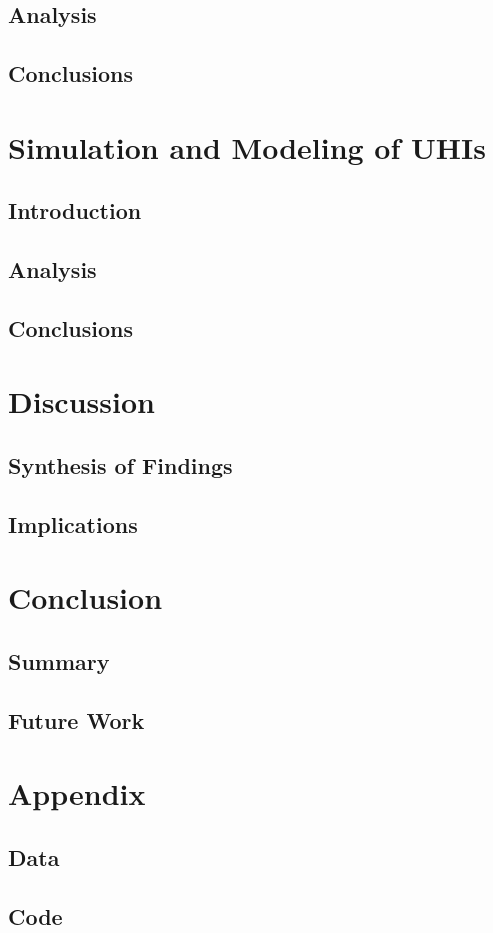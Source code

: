 \documentclass[a4paper, english]{article}
\begin{document}
    \subsection{Analysis}
    \subsection{Conclusions}

\section{Simulation and Modeling of UHIs}
    \subsection{Introduction}
    \subsection{Analysis}
    \subsection{Conclusions}

\section{Discussion}
    \subsection{Synthesis of Findings}
    \subsection{Implications}

\section{Conclusion}
    \subsection{Summary}
    \subsection{Future Work}

\section{Appendix}
    \subsection{Data}
    \subsection{Code}


\newpage
\printbibliography
\end{document}
